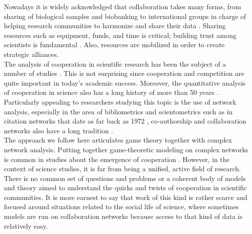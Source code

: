 \documentclass{bmcart}
\begin{document}
Nowadays it is widely acknowledged that collaboration takes many forms, from
sharing of biological samples and biobanking to international groups in charge
of helping research communities to harmonize and share their data {\color{red}
\cite{VermeulenPenders:2013,Barrett-etal:2013,Federer-etal:2015,Karimi-Busheri:2015,Vallance-etal:2016,Warner-etal:2017}. Sharing
resources such as equipment, funds, and time is critical; building trust among
scientists is fundamental \cite{Bennett-etal:2010,Leite:2017}. Also, resources are mobilized
in order to create strategic alliances.}\\ 


{\color{red}The analysis of cooperation in scientific research has been the
subject of a number of studies
\cite{VermeulenPenders:2013,Newman:2001,Newman:2004,Elango-etal:2012,HernandezLemus:2013,Strasser:2006,Strasser:2012}. This
is not surprising since cooperation and competition are quite
important in today's academic success. Moreover, the quantitative
analysis of cooperation in science also has a long history of more
than 50 years
\cite{Mali-etal:2012,Scharnhorst-etal:2012}. Particularly appealing to
researchers studying this topic is the use of network analysis,
especially in the area of bibliometrics and scientometrics such as in
citation networks that date as far back as 1972 \cite{Garfield:1972},
co-authorship and collaboration networks also have a long tradition
\cite{Todorov-etal:1991,Wagner-etal:2017}.}\\

{\color{red}The approach we follow here articulates game theory together with
complex network analysis. Putting together game-theoretic modeling on
complex networks is common in studies about the emergence of
cooperation
\cite{SzaboFath:2007,Nowak-etal:92,OshtukiNowak:2006,Santos-etal:2005,Santos-etal:2006}.
However, in the context of science studies, it is far from being a
unified, active field of research. There is no common set of questions
and problems or a coherent body of models and theory aimed to
understand the quirks and twists of cooperation in scientific
communities. It is more earnest to say that work of this kind is
rather scarce and focused around situations related to
the social life of science, where sometimes models are run on
collaboration networks because access to that kind of data is
relatively easy.}\\
\end{document}
